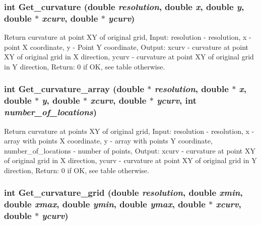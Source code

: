 \hypertarget{GisApi_8C_a72}{
\subsubsection[Get\_\-curvature]{\setlength{\rightskip}{0pt plus 5cm}int Get\_\-curvature (double {\em resolution}, double {\em x}, double {\em y}, double $\ast$ {\em xcurv}, double $\ast$ {\em ycurv})}}
\label{GisApi_8C_a72}


Return curvature at point XY of original grid, Input: resolution - resolution, x - point X coordinate, y - Point Y coordinate, Output: xcurv - curvature at point XY of original grid in X direction, ycurv - curvature at point XY of original grid in Y direction, Return: 0 if OK, see table otherwise. 

\hypertarget{GisApi_8C_a77}{
\subsubsection[Get\_\-curvature\_\-array]{\setlength{\rightskip}{0pt plus 5cm}int Get\_\-curvature\_\-array (double $\ast$ {\em resolution}, double $\ast$ {\em x}, double $\ast$ {\em y}, double $\ast$ {\em xcurv}, double $\ast$ {\em ycurv}, int {\em number\_\-of\_\-locations})}}
\label{GisApi_8C_a77}


Return curvature at points XY of original grid, Input: resolution - resolution, x - array with points X coordinate, y - array with points Y coordinate, number\_\-of\_\-locations - number of points, Output: xcurv - curvature at point XY of original grid in X direction, ycurv - curvature at point XY of original grid in Y direction, Return: 0 if OK, see table otherwise. 

\hypertarget{GisApi_8C_a82}{
\subsubsection[Get\_\-curvature\_\-grid]{\setlength{\rightskip}{0pt plus 5cm}int Get\_\-curvature\_\-grid (double {\em resolution}, double {\em xmin}, double {\em xmax}, double {\em ymin}, double {\em ymax}, double $\ast$ {\em xcurv}, double $\ast$ {\em ycurv})}}
\label{GisApi_8C_a82}


